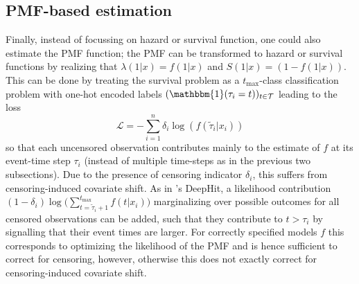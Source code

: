 \documentclass{article}
\newcommand{\Tc}{{\mathcal T}}
\newcommand{\one}{{\mathbbm{1}}}
\newcommand{\tmax}{{t_{\text{max}}}}
\newcommand*\CL{\color{blue}}
\begin{document}
\subsection{PMF-based estimation}
Finally, instead of focussing on hazard or survival function, one could also estimate the PMF function; the PMF can be transformed to hazard or survival functions by realizing that $\lambda(1|x) = f(1|x)$ and $S(1|x)=(1-f(1|x))$. This can be done by treating the survival problem as a $\tmax$-class classification problem with one-hot encoded labels $(\one(\tau_i = t))_{t \in \Tc}$ leading to the loss
\begin{equation}
    \mathcal{L} =  - \sum^n_{i=1} \delta_i\log(f(\tilde{\tau}_i|x_i)) 
\end{equation}
so that each uncensored observation contributes mainly to the estimate of $f$ at its event-time step $\tau_i$  \cite{ren2017dsra} (instead of multiple time-steps as in the previous two subsections). Due to the presence of censoring indicator $\delta_i$, this suffers from censoring-induced covariate shift. As in \cite{Changhee:AAAI18}'s DeepHit, a likelihood contribution $(1-\delta_i) \log\big(\sum^\tmax_{t=\tilde{\tau}_i+1} f(t|x_i)\big)$ marginalizing over possible outcomes for all censored observations can be added, such that they contribute to $t> \tau_i$ by signalling that their event times are larger. For correctly specified models $f$ this corresponds to optimizing the likelihood of the PMF and is hence sufficient to correct for censoring, however, otherwise this does not exactly correct for censoring-induced covariate shift. %
\end{document}
